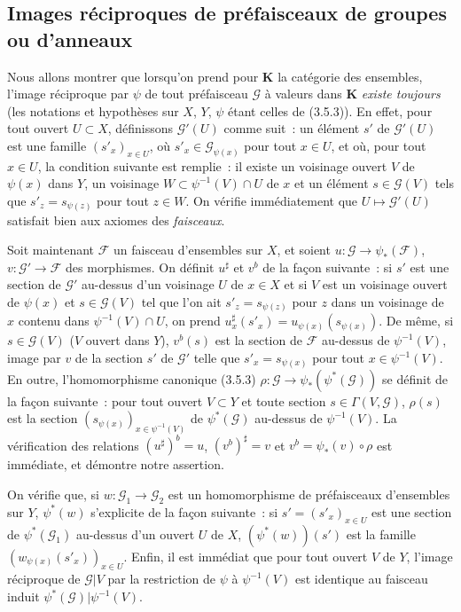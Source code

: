 \subsection{Images réciproques de préfaisceaux de groupes ou d'anneaux}


\begin{env}[3.7.1]
\label{0.3.7.1-fr}
Nous allons montrer que lorsqu'on prend pour $\mathbf{K}$ la catégorie des
ensembles, l'image réciproque par $\psi$ de tout préfaisceau $\mathcal{G}$ à
valeurs dans $\mathbf{K}$ \emph{existe toujours} (les notations et hypothèses
sur $X$, $Y$, $\psi$ étant celles de (3.5.3)). En effet, pour tout ouvert
$U\subset X$, définissons $\mathcal{G}'(U)$ comme suit~: un élément $s'$ de
$\mathcal{G}'(U)$ est une famille $(s'_x)_{x\in U}$, où
$s'_x\in\mathcal{G}_{\psi(x)}$ pour tout $x\in U$, et où, pour tout $x\in U$,
la condition suivante est remplie~: il existe un voisinage ouvert $V$ de
$\psi(x)$ dans $Y$, un voisinage $W\subset\psi^{-1}(V)\cap U$ de $x$ et un
élément $s\in\mathcal{G}(V)$ tels que $s'_z=s_{\psi(z)}$ pour tout $z\in W$.
On vérifie immédiatement que $U\mapsto\mathcal{G}'(U)$ satisfait bien aux axiomes
des \emph{faisceaux}.

Soit maintenant $\mathcal{F}$ un faisceau d'ensembles sur $X$, et soient
$u:\mathcal{G}\to\psi_*(\mathcal{F})$,
$v:\mathcal{G}'\to\mathcal{F}$ des morphismes. On définit $u^\sharp$ et $v^b$
de la façon suivante~: si $s'$ est une section de $\mathcal{G}'$ au-dessus
d'un voisinage $U$ de $x\in X$ et si $V$ est un voisinage ouvert de $\psi(x)$
et $s\in\mathcal{G}(V)$ tel que l'on ait $s'_z=s_{\psi(z)}$ pour $z$ dans un
voisinage de $x$ contenu dans $\psi^{-1}(V)\cap U$, on prend
$u_x^\sharp(s'_x)=u_{\psi(x)}(s_{\psi(x)})$. De même, si
$s\in\mathcal{G}(V)$ ($V$ ouvert dans $Y$), $v^b(s)$ est la section de
$\mathcal{F}$ au-dessus de $\psi^{-1}(V)$, image par $v$ de la section $s'$ de
$\mathcal{G}'$ telle que $s'_x=s_{\psi(x)}$ pour tout
$x\in\psi^{-1}(V)$. En outre, l'homomorphisme canonique (3.5.3)
$\rho:\mathcal{G}\to\psi_*(\psi^*(\mathcal{G}))$ se définit de la façon
suivante~: pour tout ouvert $V\subset Y$ et toute section
$s\in\Gamma(V,\mathcal{G})$, $\rho(s)$ est la section
$(s_{\psi(x)})_{x\in\psi^{-1}(V)}$ de $\psi^*(\mathcal{G})$ au-dessus de
$\psi^{-1}(V)$. La vérification des relations
$(u^\sharp)^b=u$, $(v^b)^\sharp=v$ et
$v^b=\psi_*(v)\circ\rho$ est immédiate, et démontre notre assertion.

On vérifie que, si $w:\mathcal{G}_1\to\mathcal{G}_2$ est un homomorphisme de
préfaisceaux d'ensembles sur $Y$, $\psi^*(w)$ s'explicite de la façon
suivante~: si $s'=(s'_x)_{x\in U}$ est une section de
$\psi^*(\mathcal{G}_1)$ au-dessus d'un ouvert $U$ de $X$,
$(\psi^*(w))(s')$ est la famille
$(w_{\psi(x)}(s'_x))_{x\in U}$. Enfin, il est immédiat que pour tout ouvert
$V$ de $Y$, l'image réciproque de $\mathcal{G}|V$ par la restriction de
$\psi$ à $\psi^{-1}(V)$ est identique au faisceau induit
$\psi^*(\mathcal{G})|\psi^{-1}(V)$.


\end{env}
